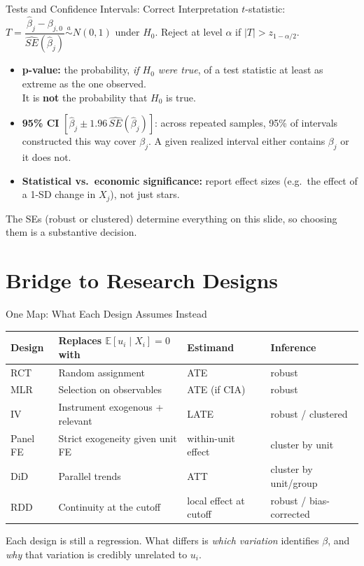 \documentclass[9pt,aspectratio=169]{beamer}
\newcommand{\E}{\mathbb{E}}
\newcommand{\SEhat}{\widehat{SE}}
\begin{document}
\begin{frame}{Tests and Confidence Intervals: Correct Interpretation}
\linespread{1.2}\selectfont
  $t$-statistic: $T=\dfrac{\hat\beta_j-\beta_{j,0}}{\SEhat(\hat\beta_j)}\overset{a}{\sim}N(0,1)$ under $H_0$. Reject at level $\alpha$ if $|T|>z_{1-\alpha/2}$.
  \medskip

  \begin{itemize}
    \item \textbf{p-value:} the probability, \emph{if $H_0$ were true}, of a test statistic at least as extreme as the one observed.\\ It is \textbf{not} the probability that $H_0$ is true.
    \item \textbf{95\% CI} $[\hat\beta_j\pm1.96\,\SEhat(\hat\beta_j)]$: across repeated samples, 95\% of intervals constructed this way cover $\beta_j$. A given realized interval either contains $\beta_j$ or it does not.
    \item \textbf{Statistical vs.\ economic significance:} report effect sizes (e.g.\ the effect of a 1-SD change in $X_j$), not just stars.
  \end{itemize}
  \medskip
  The SEs (robust or clustered) determine everything on this slide, so choosing them is a substantive decision.
\end{frame}

\section{Bridge to Research Designs}

\begin{frame}{One Map: What Each Design Assumes Instead}
\linespread{1.2}\selectfont
  \begin{tabular}{@{}llll@{}}
    \toprule
    Design & Replaces $\E[u_i\mid X_i]=0$ with & Estimand & Inference \\
    \midrule
    RCT & Random assignment & ATE & robust \\
    MLR & Selection on observables & ATE (if CIA) & robust \\
    IV & Instrument exogenous + relevant & LATE & robust / clustered \\
    Panel FE & Strict exogeneity given unit FE & within-unit effect & cluster by unit \\
    DiD & Parallel trends & ATT & cluster by unit/group \\
    RDD & Continuity at the cutoff & local effect at cutoff & robust / bias-corrected \\
    \bottomrule
  \end{tabular}
  \medskip

  \normalsize
  Each design is still a regression. What differs is \emph{which variation} identifies $\beta$, and \emph{why} that variation is credibly unrelated to $u_i$.
\end{frame}
\end{document}
